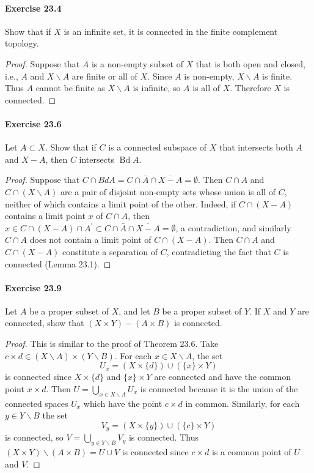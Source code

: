 \documentclass{article}
\begin{document}
\paragraph{Exercise 23.4} Show that if $X$ is an infinite set, it is connected in the finite complement topology.
\begin{proof}
    Suppose that $A$ is a non-empty subset of $X$ that is both open and closed, i.e., $A$ and $X \backslash A$ are finite or all of $X$. Since $A$ is non-empty, $X \backslash A$ is finite. Thus $A$ cannot be finite as $X \backslash A$ is infinite, so $A$ is all of $X$. Therefore $X$ is connected.
\end{proof}



\paragraph{Exercise 23.6} Let $A \subset X$. Show that if $C$ is a connected subspace of $X$ that intersects both $A$ and $X-A$, then $C$ intersects $\operatorname{Bd} A$.
\begin{proof}
    Suppose that $C \cap B d A=C \cap \bar{A} \cap \overline{X-A}=\emptyset$. Then $C \cap A$ and $C \cap(X \backslash A)$ are a pair of disjoint non-empty sets whose union is all of $C$, neither of which contains a limit point of the other. Indeed, if $C \cap(X-A)$ contains a limit point $x$ of $C \cap A$, then $x \in C \cap(X-A) \cap A^{\prime} \subset C \cap \bar{A} \cap \overline{X-A}=\emptyset$, a contradiction, and similarly $C \cap A$ does not contain a limit point of $C \cap(X-A)$. Then $C \cap A$ and $C \cap(X-A)$ constitute a separation of $C$, contradicting the fact that $C$ is connected (Lemma 23.1).
\end{proof}



\paragraph{Exercise 23.9} Let $A$ be a proper subset of $X$, and let $B$ be a proper subset of $Y$. If $X$ and $Y$ are connected, show that $(X \times Y)-(A \times B)$ is connected.
\begin{proof}
This is similar to the proof of Theorem 23.6. Take $c \times d \in(X \backslash A) \times(Y \backslash B)$. For each $x \in X \backslash A$, the set
$$
U_x=(X \times\{d\}) \cup(\{x\} \times Y)
$$
is connected since $X \times\{d\}$ and $\{x\} \times Y$ are connected and have the common point $x \times d$. Then $U=\bigcup_{x \in X \backslash A} U_x$ is connected because it is the union of the connected spaces $U_x$ which have the point $c \times d$ in common. Similarly, for each $y \in Y \backslash B$ the set
$$
V_y=(X \times\{y\}) \cup(\{c\} \times Y)
$$
is connected, so $V=\bigcup_{y \in Y \backslash B} V_y$ is connected. Thus $(X \times Y) \backslash(A \times B)=U \cup V$ is connected since $c \times d$ is a common point of $U$ and $V$.
\end{proof}
\end{document}
